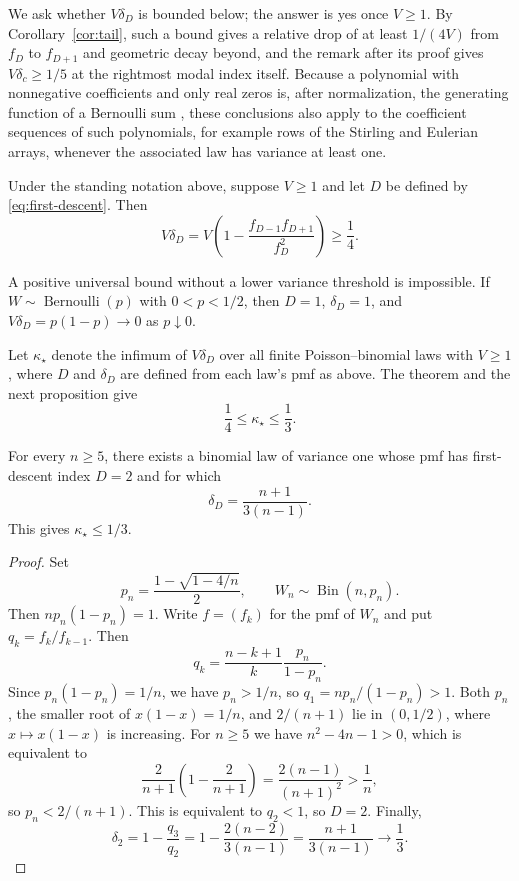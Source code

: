 \documentclass[ECP,preprint]{ejpecp}
\newcommand{\Ber}{\operatorname{Bernoulli}}
\begin{document}
We ask whether $V\delta_D$ is bounded below; the answer is yes once $V\geq1$.
By Corollary~\ref{cor:tail}, such a bound gives a relative drop of at least
$1/(4V)$ from $f_D$ to $f_{D+1}$ and geometric decay beyond, and the remark
after its proof gives $V\delta_c\geq1/5$ at the rightmost modal index itself.
Because a polynomial with nonnegative coefficients and only real zeros is,
after normalization, the generating function of a Bernoulli sum
\cite[Proposition~1]{pitman1997},
these conclusions also apply to the coefficient sequences of such
polynomials, for example rows of the Stirling and Eulerian arrays, whenever
the associated law has variance at least one.

\begin{theorem}\label{thm:main}
  Under the standing notation above, suppose $V\geq1$ and let $D$ be defined
  by \eqref{eq:first-descent}. Then
  \begin{equation}\label{eq:main-bound}
    V\delta_D
    =V\left(1-\frac{f_{D-1}f_{D+1}}{f_D^2}\right)
    \geq\frac14.
  \end{equation}
\end{theorem}

A positive universal bound without a lower variance threshold is impossible.
If $W\sim\Ber(p)$ with $0<p<1/2$, then $D=1$, $\delta_D=1$, and
$V\delta_D=p(1-p)\to0$ as $p\downarrow0$.

Let $\kappa_\star$ denote the infimum of $V\delta_D$ over all finite
Poisson--binomial laws with $V\geq1$, where $D$ and $\delta_D$ are defined
from each law's pmf as above. The theorem and the next proposition give
\begin{equation}\label{eq:constant-bracket}
  \frac14\leq\kappa_\star\leq\frac13.
\end{equation}

\begin{proposition}\label{prop:one-third}
  For every $n\geq5$, there exists a binomial law of variance one whose pmf has
  first-descent index $D=2$ and for which
  \[
    \delta_D=\frac{n+1}{3(n-1)}.
  \]
  This gives $\kappa_\star\leq1/3$.
\end{proposition}

\begin{proof}
  Set
  \[
    p_n=\frac{1-\sqrt{1-4/n}}2,
    \qquad W_n\sim\operatorname{Bin}(n,p_n).
  \]
  Then $np_n(1-p_n)=1$. Write $f=(f_k)$ for the pmf of $W_n$ and put
  $q_k=f_k/f_{k-1}$. Then
  \[
    q_k=\frac{n-k+1}{k}\frac{p_n}{1-p_n}.
  \]
  Since $p_n(1-p_n)=1/n$, we have $p_n>1/n$, so $q_1=np_n/(1-p_n)>1$.
  Both $p_n$, the smaller root of $x(1-x)=1/n$, and $2/(n+1)$ lie in
  $(0,1/2)$, where $x\mapsto x(1-x)$ is increasing. For $n\geq5$ we have $n^2-4n-1>0$,
  which is equivalent to
  \[
    \frac{2}{n+1}\left(1-\frac{2}{n+1}\right)
    =\frac{2(n-1)}{(n+1)^2}>\frac1n,
  \]
  so $p_n<2/(n+1)$. This is equivalent to $q_2<1$, so $D=2$. Finally,
  \[
    \delta_2=1-\frac{q_3}{q_2}
    =1-\frac{2(n-2)}{3(n-1)}
    =\frac{n+1}{3(n-1)}\longrightarrow\frac13.
  \]
\end{proof}
\end{document}
